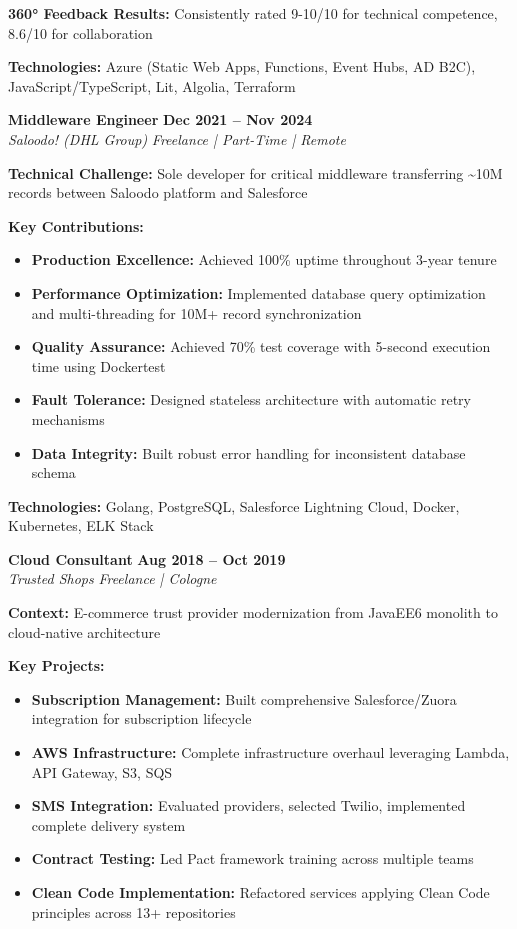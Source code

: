 \documentclass[11pt,a4paper]{article}
\newcommand{\jobheader}[4]{%
    \textbf{\large #1} \hfill \textbf{#2} \\
    \textit{#3} \hfill \textit{#4}
}
\begin{document}
\textbf{360° Feedback Results:} Consistently rated 9-10/10 for technical competence, 8.6/10 for collaboration

\textbf{Technologies:} Azure (Static Web Apps, Functions, Event Hubs, AD B2C), JavaScript/TypeScript, Lit, Algolia, Terraform

\vspace{1em}

\jobheader{Middleware Engineer}{Dec 2021 -- Nov 2024}{Saloodo! (DHL Group)}{Freelance | Part-Time | Remote}

\textbf{Technical Challenge:} Sole developer for critical middleware transferring \textasciitilde 10M records between Saloodo platform and Salesforce

\textbf{Key Contributions:}
\begin{itemize}[leftmargin=*,noitemsep,topsep=0pt]
\item \textbf{Production Excellence:} Achieved 100\% uptime throughout 3-year tenure
\item \textbf{Performance Optimization:} Implemented database query optimization and multi-threading for 10M+ record synchronization
\item \textbf{Quality Assurance:} Achieved 70\% test coverage with 5-second execution time using Dockertest
\item \textbf{Fault Tolerance:} Designed stateless architecture with automatic retry mechanisms
\item \textbf{Data Integrity:} Built robust error handling for inconsistent database schema
\end{itemize}

\textbf{Technologies:} Golang, PostgreSQL, Salesforce Lightning Cloud, Docker, Kubernetes, ELK Stack

\newpage

\jobheader{Cloud Consultant}{Aug 2018 -- Oct 2019}{Trusted Shops}{Freelance | Cologne}

\textbf{Context:} E-commerce trust provider modernization from JavaEE6 monolith to cloud-native architecture

\textbf{Key Projects:}
\begin{itemize}[leftmargin=*,noitemsep,topsep=0pt]
\item \textbf{Subscription Management:} Built comprehensive Salesforce/Zuora integration for subscription lifecycle
\item \textbf{AWS Infrastructure:} Complete infrastructure overhaul leveraging Lambda, API Gateway, S3, SQS
\item \textbf{SMS Integration:} Evaluated providers, selected Twilio, implemented complete delivery system
\item \textbf{Contract Testing:} Led Pact framework training across multiple teams
\item \textbf{Clean Code Implementation:} Refactored services applying Clean Code principles across 13+ repositories
\end{itemize}
\end{document}
